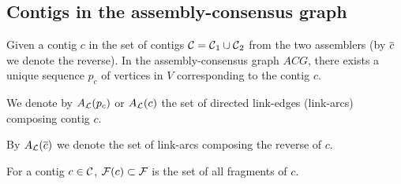 \subsection{Contigs in the assembly-consensus graph}

Given a contig \(c\) in the set of contigs \(\mathcal{C}{} = \mathcal{C}{}_1 \cup \mathcal{C}{}_2\) from the two assemblers (by \(\overline{c}\) we denote the reverse).
In the assembly-consensus graph \(ACG\), there exists a unique sequence \(p_c\) of vertices in \(V\) corresponding to the contig \(c\).

We denote by \(A_{\mathcal{L}}{}(p_c)\) or \(A_{\mathcal{L}}{}(c)\) the set of directed link-edges (link-arcs) composing contig \(c\).

\begin{notebox}
  By \(A_{\mathcal{L}}{}(\overline{c})\) we denote the set of link-arcs composing the reverse of \(c\).
\end{notebox}

For a contig \(c \in \mathcal{C}{}\), \(\mathcal{F}{}(c) \subset \mathcal{F}{}\) is the set of all fragments of \(c\).
